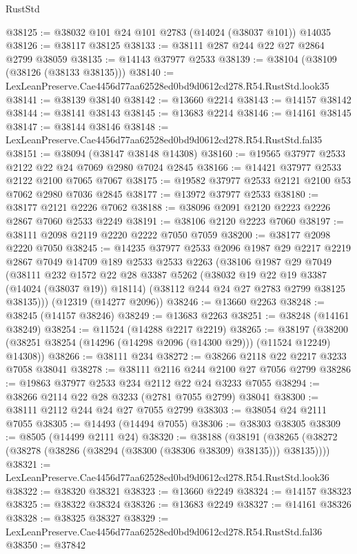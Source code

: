 \begin{lexlean}{RustStd}
\begin{coremodule}
@38125 := @38032 @101 @24 @101 @2783 (@14024 (@38037 @101)) @14035
@38126 := @38117 @38125
@38133 := @38111 @287 @244 @22 @27 @2864 @2799 @38059
@38135 := @14143 @37977 @2533
@38139 := @38104 (@38109 (@38126 (@38133 @38135)))
@38140 := LexLeanPreserve.Cae4456d77aa62528ed0bd9d0612cd278.R54.RustStd.look35
@38141 := @38139 @38140
@38142 := @13660 @2214
@38143 := @14157 @38142
@38144 := @38141 @38143
@38145 := @13683 @2214
@38146 := @14161 @38145
@38147 := @38144 @38146
@38148 := LexLeanPreserve.Cae4456d77aa62528ed0bd9d0612cd278.R54.RustStd.fal35
@38151 := @38094 (@38147 @38148 @14308)
@38160 := @19565 @37977 @2533 @2122 @22 @24 @7069 @2980 @7024 @2845
@38166 := @14421 @37977 @2533 @2122 @2100 @7065 @7067
@38175 := @19582 @37977 @2533 @2121 @2100 @53 @7062 @2980 @7036 @2845
@38177 := @13972 @37977 @2533
@38180 := @38177 @2121 @2226 @7062
@38188 := @38096 @2091 @2120 @2223 @2226 @2867 @7060 @2533 @2249
@38191 := @38106 @2120 @2223 @7060
@38197 := @38111 @2098 @2119 @2220 @2222 @7050 @7059
@38200 := @38177 @2098 @2220 @7050
@38245 := @14235
    @37977
    @2533
    @2096
    @1987
    @29
    @2217
    @2219
    @2867
    @7049
    @14709
    @189
    @2533
    @2533
    @2263
    (@38106
      @1987
      @29
      @7049
      (@38111
        @232
        @1572
        @22
        @28
        @3387
        @5262
        (@38032 @19 @22 @19 @3387 (@14024 (@38037 @19)) @18114)
        (@38112 @244 @24 @27 @2783 @2799 @38125 @38135)))
    (@12319 (@14277 @2096))
@38246 := @13660 @2263
@38248 := @38245 (@14157 @38246)
@38249 := @13683 @2263
@38251 := @38248 (@14161 @38249)
@38254 := @11524 (@14288 @2217 @2219)
@38265 := @38197
    (@38200 (@38251 @38254 (@14296 (@14298 @2096 (@14300 @29))) (@11524 @12249) @14308))
@38266 := @38111 @234
@38272 := @38266 @2118 @22 @2217 @3233 @7058 @38041
@38278 := @38111 @2116 @244 @2100 @27 @7056 @2799
@38286 := @19863 @37977 @2533 @234 @2112 @22 @24 @3233 @7055
@38294 := @38266 @2114 @22 @28 @3233 (@2781 @7055 @2799) @38041
@38300 := @38111 @2112 @244 @24 @27 @7055 @2799
@38303 := @38054 @24 @2111 @7055
@38305 := @14493 (@14494 @7055)
@38306 := @38303 @38305
@38309 := @8505 (@14499 @2111 @24)
@38320 := @38188
    (@38191 (@38265 (@38272 (@38278 (@38286 (@38294 (@38300 (@38306 @38309) @38135))) @38135))))
@38321 := LexLeanPreserve.Cae4456d77aa62528ed0bd9d0612cd278.R54.RustStd.look36
@38322 := @38320 @38321
@38323 := @13660 @2249
@38324 := @14157 @38323
@38325 := @38322 @38324
@38326 := @13683 @2249
@38327 := @14161 @38326
@38328 := @38325 @38327
@38329 := LexLeanPreserve.Cae4456d77aa62528ed0bd9d0612cd278.R54.RustStd.fal36
@38350 := @37842

\end{coremodule}
\end{lexlean}
